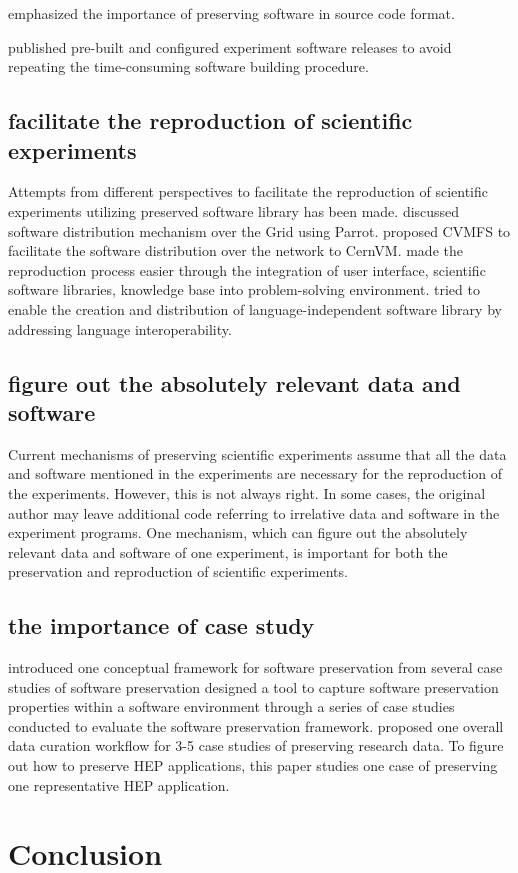 \documentclass{acm_proc_article-sp}
\begin{document}
\cite{zabolitzky2002preserving}\cite{castagne2013consider} emphasized the importance of preserving software in source code format. 

\cite{buncic2010cernvm} published pre-built and configured experiment software releases to avoid repeating the time-consuming software building procedure. 

\subsection{facilitate the reproduction of scientific experiments}

Attempts from different perspectives to facilitate the reproduction of scientific experiments utilizing preserved software library has been made. 
\cite{compostella2010cdf} discussed software distribution mechanism over the Grid using Parrot. 
\cite{blomer2011cernvm} proposed CVMFS to facilitate the software distribution over the network to CernVM. 
\cite{rice1996scientific} made the reproduction process easier through the integration of user interface, scientific software libraries, knowledge base into problem-solving environment.
\cite{kohn2001divorcing} tried to enable the creation and distribution of language-independent software library by addressing language interoperability.

\subsection{figure out the absolutely relevant data and software }

Current mechanisms of preserving scientific experiments assume that all the data and software mentioned in the experiments are necessary for the reproduction of the experiments. However, this is not always right. In some cases, the original author may leave additional code referring to irrelative data and software in the experiment programs. One mechanism, which can figure out the absolutely relevant data and software of one experiment, is important for both the preservation and reproduction of scientific experiments.

\subsection{the importance of case study}
\cite{matthews2008significant} introduced one conceptual framework for software preservation from several case studies of software preservation
\cite{matthews2010framework} designed a tool to capture software preservation properties within a software environment through a series of case studies conducted to evaluate the software preservation framework.
\cite{johnston2014workflow} proposed one overall data curation workflow for 3-5 case studies of preserving research data.
To figure out how to preserve HEP applications, this paper studies one case of preserving one representative HEP application.


\section{Conclusion}




\end{document}
